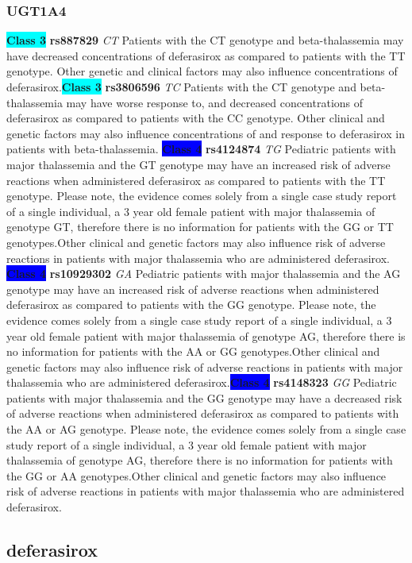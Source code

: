 \documentclass{book}
\begin{document}
\subsubsection{ UGT1A4 }

\begin{center}
\textbf{\colorbox{cyan} {Class 3}} \textbf{ rs887829 } \textit{ CT }
Patients with the CT genotype and beta-thalassemia may have decreased concentrations of deferasirox as compared to patients with the TT genotype. Other genetic and clinical factors may also influence concentrations of deferasirox.\textbf{\colorbox{cyan} {Class 3}} \textbf{ rs3806596 } \textit{ TC }
Patients with the CT genotype and beta-thalassemia may have worse response to, and decreased concentrations of deferasirox as compared to patients with the CC genotype. Other clinical and genetic factors may also influence concentrations of and response to deferasirox in patients with beta-thalassemia.
\textbf{\colorbox{blue} {Class 4}} \textbf{ rs4124874 } \textit{ TG }
Pediatric patients with major thalassemia and the GT genotype may have an increased risk of adverse reactions when administered deferasirox as compared to patients with the TT genotype. Please note, the evidence comes solely from a single case study report of a single individual, a 3 year old female patient with major thalassemia of genotype GT, therefore there is no information for patients with the GG or TT genotypes.Other clinical and genetic factors may also influence risk of adverse reactions in patients with major thalassemia who are administered deferasirox. \textbf{\colorbox{blue} {Class 4}} \textbf{ rs10929302 } \textit{ GA }
Pediatric patients with major thalassemia and the AG genotype may have an increased risk of adverse reactions when administered deferasirox as compared to patients with the GG genotype. Please note, the evidence comes solely from a single case study report of a single individual, a 3 year old female patient with major thalassemia of genotype AG, therefore there is no information for patients with the AA or GG genotypes.Other clinical and genetic factors may also influence risk of adverse reactions in patients with major thalassemia who are administered deferasirox.\textbf{\colorbox{blue} {Class 4}} \textbf{ rs4148323 } \textit{ GG }
Pediatric patients with major thalassemia and the GG genotype may have a decreased risk of adverse reactions when administered deferasirox as compared to patients with the AA or AG genotype. Please note, the evidence comes solely from a single case study report of a single individual, a 3 year old female patient with major thalassemia of genotype AG, therefore there is no information for patients with the GG or AA genotypes.Other clinical and genetic factors may also influence risk of adverse reactions in patients with major thalassemia who are administered deferasirox.

\end{center}\subsection{ deferasirox }
\end{document}
